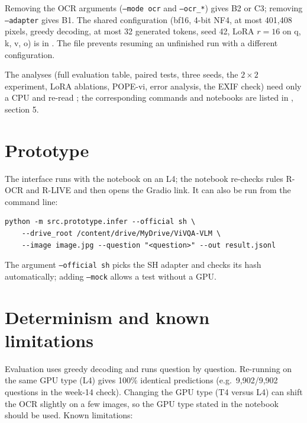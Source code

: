 Removing the OCR arguments (\texttt{--mode ocr} and \texttt{--ocr\_*}) gives B2 or C3; removing
\texttt{--adapter} gives B1. The shared configuration (bf16, 4-bit NF4, at most 401,408 pixels,
greedy decoding, at most 32 generated tokens, seed 42, LoRA $r = 16$ on q, k, v, o) is in
. The file  prevents resuming an
unfinished run with a different configuration.

The analyses (full evaluation table, paired tests, three seeds, the $2\times2$ experiment, LoRA
ablations, POPE-vi, error analysis, the EXIF check) need only a CPU and re-read
; the corresponding commands and notebooks are listed in
, section 5.

\section{Prototype}

The interface runs with the notebook  on an
L4; the notebook re-checks rules R-OCR and R-LIVE and then opens the Gradio link. It can also
be run from the command line:

\begin{small}
\begin{verbatim}
python -m src.prototype.infer --official sh \
    --drive_root /content/drive/MyDrive/ViVQA-VLM \
    --image image.jpg --question "<question>" --out result.jsonl
\end{verbatim}
\end{small}

The argument \texttt{--official sh} picks the SH adapter and checks its hash automatically;
adding \texttt{--mock} allows a test without a GPU.

\section{Determinism and known limitations}

Evaluation uses greedy decoding and runs question by question. Re-running on the same GPU type
(L4) gives 100\% identical predictions (e.g.\ 9,902/9,902 questions in the week-14 check).
Changing the GPU type (T4 versus L4) can shift the OCR slightly on a few images, so the GPU type
stated in the notebook should be used. Known limitations:

